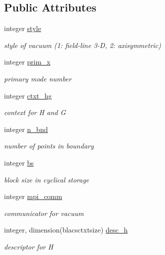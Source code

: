 \subsection*{Public Attributes}
\begin{DoxyCompactItemize}
\item 
integer \hyperlink{structvac__vars_1_1vac__type_afbd856ce1a362b252a9d8195b83546cd}{style}
\begin{DoxyCompactList}\small\item\em style of vacuum (1\+: field-\/line 3-\/D, 2\+: axisymmetric) \end{DoxyCompactList}\item 
integer \hyperlink{structvac__vars_1_1vac__type_a75bec679a19120000183f0d0d6fcd880}{prim\+\_\+x}
\begin{DoxyCompactList}\small\item\em primary mode number \end{DoxyCompactList}\item 
integer \hyperlink{structvac__vars_1_1vac__type_a975901d1517e02c7a78be46054decde0}{ctxt\+\_\+hg}
\begin{DoxyCompactList}\small\item\em context for H and G \end{DoxyCompactList}\item 
integer \hyperlink{structvac__vars_1_1vac__type_a099ac67e58545d9dd3863d0397f37b05}{n\+\_\+bnd}
\begin{DoxyCompactList}\small\item\em number of points in boundary \end{DoxyCompactList}\item 
integer \hyperlink{structvac__vars_1_1vac__type_aacac3cfc228c0a5de03540bf63bc9014}{bs}
\begin{DoxyCompactList}\small\item\em block size in cyclical storage \end{DoxyCompactList}\item 
integer \hyperlink{structvac__vars_1_1vac__type_af24c1254132acf04aef2f91952b73243}{mpi\+\_\+comm}
\begin{DoxyCompactList}\small\item\em communicator for vacuum \end{DoxyCompactList}\item 
integer, dimension(blacsctxtsize) \hyperlink{structvac__vars_1_1vac__type_a7d588dd9ece3c1a645329431769c28de}{desc\+\_\+h}
\begin{DoxyCompactList}\small\item\em descriptor for H \end{DoxyCompactList}\item 

\end{DoxyCompactItemize}
